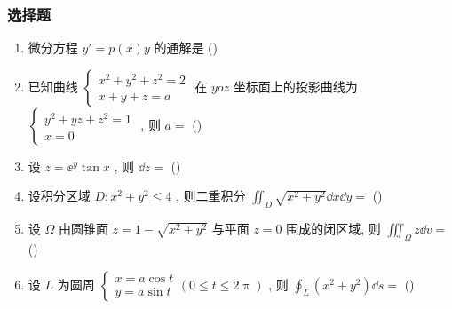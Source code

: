 \subsubsection{选择题}
\begin{enumerate}
	\item 微分方程 $y'=p(x) y$ 的通解是 (\hspace{1pc})
	
	\item 已知曲线 $\begin{cases}
	x^{2}+y^{2}+z^{2}=2\\
	x+y+z=a
	\end{cases}$ 在 $yoz$ 坐标面上的投影曲线为 $\begin{cases}
		y^{2}+y z+z^{2}=1\\
		x=0
	\end{cases}$ , 则 $a=$ (\hspace{1pc})
	
	\item 设 $z=\ee^{y} \tan x$ , 则 $\dd z=$ (\hspace{1pc})
	
	\item 设积分区域 $D : x^{2}+y^{2} \leq 4$ , 则二重积分 $\iint_{D} \sqrt{x^{2}+y^{2}} \dd x \dd y=$ (\hspace{1pc})
	
	\item 设 $\Omega$ 由圆锥面 $z=1-\sqrt{x^{2}+y^{2}}$ 与平面 $z=0$ 围成的闭区域, 则 $\iiint_{\Omega} z \dd v=$ (\hspace{1pc})
	
	\item 设 $L$ 为圆周 $\begin{cases}
	x=a \cos t\\
	y=a \sin t
	\end{cases}(0\leq t\leq 2\uppi)$ , 则 $\oint_{L}\left(x^{2}+y^{2}\right) \dd s=$ (\hspace{1pc})
	

\end{enumerate}
